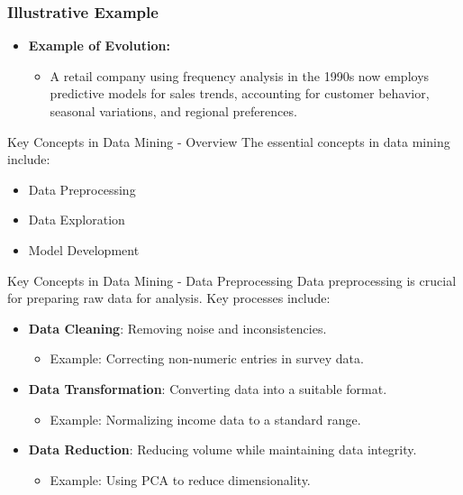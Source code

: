 \documentclass[aspectratio=169]{beamer}
\begin{document}
\begin{frame}[fragile]
    \frametitle{Illustrative Example}
    \begin{itemize}
        \item \textbf{Example of Evolution:}
            \begin{itemize}
                \item A retail company using frequency analysis in the 1990s now employs predictive models for sales trends, accounting for customer behavior, seasonal variations, and regional preferences.
            \end{itemize}
    \end{itemize}
\end{frame}

\begin{frame}[fragile]{Key Concepts in Data Mining - Overview}
    The essential concepts in data mining include:
    \begin{itemize}
        \item Data Preprocessing
        \item Data Exploration
        \item Model Development
    \end{itemize}
\end{frame}

\begin{frame}[fragile]{Key Concepts in Data Mining - Data Preprocessing}
    Data preprocessing is crucial for preparing raw data for analysis. Key processes include:
    \begin{itemize}
        \item \textbf{Data Cleaning}: Removing noise and inconsistencies.
        \begin{itemize}
            \item Example: Correcting non-numeric entries in survey data.
        \end{itemize}
        \item \textbf{Data Transformation}: Converting data into a suitable format.
        \begin{itemize}
            \item Example: Normalizing income data to a standard range.
        \end{itemize}
        \item \textbf{Data Reduction}: Reducing volume while maintaining data integrity.
        \begin{itemize}
            \item Example: Using PCA to reduce dimensionality.
        \end{itemize}
    \end{itemize}
\end{frame}
\end{document}
